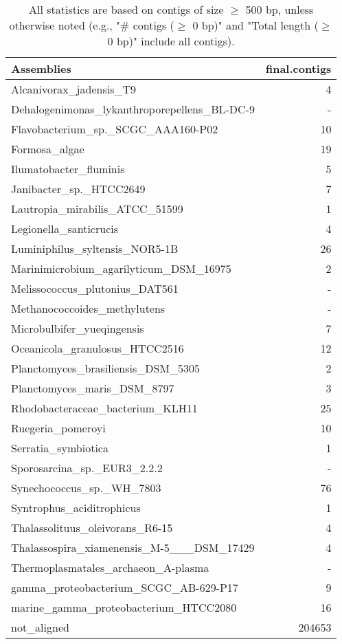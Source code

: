 \documentclass[12pt,a4paper]{article}
\begin{document}
\begin{table}[ht]
\begin{center}
\caption{All statistics are based on contigs of size $\geq$ 500 bp, unless otherwise noted (e.g., "\# contigs ($\geq$ 0 bp)" and "Total length ($\geq$ 0 bp)" include all contigs).}
\begin{tabular}{|l*{1}{|r}|}
\hline
Assemblies & final.contigs \\ \hline
Alcanivorax\_jadensis\_T9 & 4 \\ \hline
Dehalogenimonas\_lykanthroporepellens\_BL-DC-9 & - \\ \hline
Flavobacterium\_sp.\_SCGC\_AAA160-P02 & 10 \\ \hline
Formosa\_algae & 19 \\ \hline
Ilumatobacter\_fluminis & 5 \\ \hline
Janibacter\_sp.\_HTCC2649 & 7 \\ \hline
Lautropia\_mirabilis\_ATCC\_51599 & 1 \\ \hline
Legionella\_santicrucis & 4 \\ \hline
Luminiphilus\_syltensis\_NOR5-1B & 26 \\ \hline
Marinimicrobium\_agarilyticum\_DSM\_16975 & 2 \\ \hline
Melissococcus\_plutonius\_DAT561 & - \\ \hline
Methanococcoides\_methylutens & - \\ \hline
Microbulbifer\_yueqingensis & 7 \\ \hline
Oceanicola\_granulosus\_HTCC2516 & 12 \\ \hline
Planctomyces\_brasiliensis\_DSM\_5305 & 2 \\ \hline
Planctomyces\_maris\_DSM\_8797 & 3 \\ \hline
Rhodobacteraceae\_bacterium\_KLH11 & 25 \\ \hline
Ruegeria\_pomeroyi & 10 \\ \hline
Serratia\_symbiotica & 1 \\ \hline
Sporosarcina\_sp.\_EUR3\_2.2.2 & - \\ \hline
Synechococcus\_sp.\_WH\_7803 & 76 \\ \hline
Syntrophus\_aciditrophicus & 1 \\ \hline
Thalassolituus\_oleivorans\_R6-15 & 4 \\ \hline
Thalassospira\_xiamenensis\_M-5\_\_\_DSM\_17429 & 4 \\ \hline
Thermoplasmatales\_archaeon\_A-plasma & - \\ \hline
gamma\_proteobacterium\_SCGC\_AB-629-P17 & 9 \\ \hline
marine\_gamma\_proteobacterium\_HTCC2080 & 16 \\ \hline
not\_aligned & 204653 \\ \hline
\end{tabular}
\end{center}
\end{table}
\end{document}
